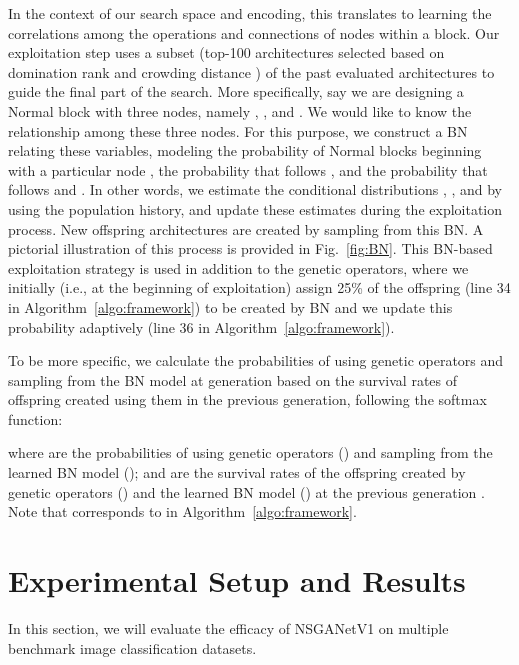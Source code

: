 \documentclass[journal]{IEEEtran}
\def\ourmethod{NSGANetV1}
\theoremstyle{definition}
\theoremstyle{remark}
\begin{document}
{In the context of our search space and encoding, this translates to learning the correlations among the operations and connections of nodes within a block. Our exploitation step uses a subset (top-100 architectures selected based on domination rank and crowding distance \cite{deb2002fast}) of the past evaluated architectures to guide the final part of the search.} More specifically, say we are designing a Normal block with three nodes, namely , , and . We would like to know the relationship among these three nodes. For this purpose, we construct a BN relating these variables, modeling the probability of Normal blocks beginning with a particular node , the probability that  follows , and the probability that  follows  and . In other words, we estimate the conditional distributions , , and  by using the population history, and update these estimates during the exploitation process. New offspring architectures are created by sampling from this BN. A pictorial illustration of this process is provided in Fig.~\ref{fig:BN}. This BN-based exploitation strategy is used in addition to the genetic operators, where we initially (i.e., at the beginning of exploitation) assign 25\% of the offspring {(line 34 in Algorithm~\ref{algo:framework})} to be created by BN and we update this probability adaptively {(line 36 in Algorithm~\ref{algo:framework})}. {To be more specific, we calculate the probabilities of using genetic operators and sampling from the BN model at generation  based on the survival rates of offspring created using them in the previous generation, following the softmax function:

where  are the probabilities of using genetic operators () and sampling from the learned BN model (); and  are the survival rates of the offspring created by genetic operators () and the learned BN model () at the previous generation . {Note that  corresponds to  in Algorithm~\ref{algo:framework}}.}










 \section{Experimental Setup and Results\label{sec:exp}}
In this section, we will evaluate the efficacy of \ourmethod{} on multiple benchmark image classification datasets.

\vspace{-2mm}
\end{document}
